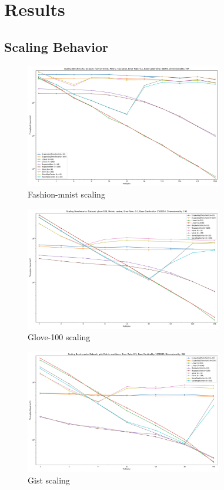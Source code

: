 \section{Results}
\label{sec:results}

\subsection{Scaling Behavior}


\begin{figure}[ht!]
    \centering
    \includegraphics[width=3.4in]{images/result_plots/fashion-mnist_0.1_scaling.png}
    \caption{
        Fashion-mnist scaling
    }
    \label{fig:results:fashion-mnist-scaling}
\end{figure}

\begin{figure}[ht!]
    \centering
    \includegraphics[width=3.4in]{images/result_plots/glove-100_0.1_scaling.png}
    \caption{
        Glove-100 scaling
    }
    \label{fig:results:glove-100-scaling}
\end{figure}


\begin{figure}[ht!]
    \centering
    \includegraphics[width=3.4in]{images/result_plots/gist_0.1_scaling.png}
    \caption{
        Gist scaling
    }
    \label{fig:results:gist-scaling}
\end{figure}


